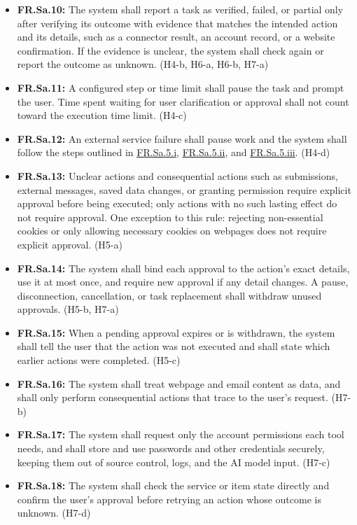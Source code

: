 \documentclass{scrreprt}
\theoremstyle{definition}
\newcommand{\reqtarget}[1]{\hypertarget{req:#1}{#1}}
\newcommand{\reqlink}[1]{\hyperlink{req:#1}{#1}}
\begin{document}
\begin{itemize}
  \item \textbf{\reqtarget{FR.Sa.10}:} The system shall report a task as verified, failed, or partial only after verifying its outcome with evidence that matches the intended action and its details, such as a connector result, an account record, or a website confirmation. If the evidence is unclear, the system shall check again or report the outcome as unknown. (H4-b, H6-a, H6-b, H7-a)
  \item \textbf{\reqtarget{FR.Sa.11}:} A configured step or time limit shall pause the task and prompt the user. Time spent waiting for user clarification or approval shall not count toward the execution time limit. (H4-c)
  \item \textbf{\reqtarget{FR.Sa.12}:} An external service failure shall pause work and the system shall follow the steps outlined in \reqlink{FR.Sa.5.i}, \reqlink{FR.Sa.5.ii}, and \reqlink{FR.Sa.5.iii}. (H4-d)
  \item \textbf{\reqtarget{FR.Sa.13}:} Unclear actions and consequential actions such as submissions, external messages, saved data changes, or granting permission require explicit approval before being executed; only actions with no such lasting effect do not require approval. One exception to this rule: rejecting non-essential cookies or only allowing necessary cookies on webpages does not require explicit approval. (H5-a)
  \item \textbf{\reqtarget{FR.Sa.14}:} The system shall bind each approval to the action's exact details, use it at most once, and require new approval if any detail changes. A pause, disconnection, cancellation, or task replacement shall withdraw unused approvals. (H5-b, H7-a)
  \item \textbf{\reqtarget{FR.Sa.15}:} When a pending approval expires or is withdrawn, the system shall tell the user that the action was not executed and shall state which earlier actions were completed. (H5-c)
  \item \textbf{\reqtarget{FR.Sa.16}:} The system shall treat webpage and email content as data, and shall only perform consequential actions that trace to the user's request. (H7-b)
  \item \textbf{\reqtarget{FR.Sa.17}:} The system shall request only the account permissions each tool needs, and shall store and use passwords and other credentials securely, keeping them out of source control, logs, and the AI model input. (H7-c)
  \item \textbf{\reqtarget{FR.Sa.18}:} The system shall check the service or item state directly and confirm the user's approval before retrying an action whose outcome is unknown. (H7-d)

\end{itemize}
\end{document}
